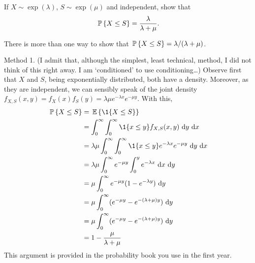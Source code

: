 \begin{question}\label{ex:3}
   If $X\sim \exp(\lambda)$, $S\sim\exp(\mu)$ and independent, show that 
    \begin{equation*}
      \P{X\leq S} = \frac{\lambda}{\lambda+\mu}.
    \end{equation*}


\begin{solution}
There is more than one way to show that $\P{X\leq S} = \lambda/(\lambda+\mu)$.  

Method 1. (I admit that, although the simplest, least technical,
method, I did not think of this right away. I am `conditioned' to use
conditioning\ldots) Observe first that $X$ and $S$, being
exponentially distributed, both have a density. Moreover, as they are
independent, we can sensibly speak of the joint density
$f_{X,S}(x,y) = f_X(x)f_S(y) = \lambda \mu e^{-\lambda x} e^{-\mu
  y}$. With this,
\begin{equation*}
  \begin{split}
    \P{X\leq S} 
&= \E{\1{X\leq S}} \\
&= \int_0^\infty \int_0^\infty \1{x\leq y} f_{X,S}(x,y)\, \d y\,\d x\\
&= \lambda \mu \int_0^\infty \int_0^\infty \1{x\leq y} e^{-\lambda x} e^{-\mu y} \, \d y\,\d x\\
&= \lambda \mu \int_0^\infty e^{-\mu y} \int_0^y e^{-\lambda x}\, \d x \, \d y \\
&= \mu \int_0^\infty e^{-\mu y} (1-e^{-\lambda y})\,\d y\\
&= \mu \int_0^\infty (e^{-\mu y} - e^{-(\lambda +\mu)y} ) \,\d y\\
&= \mu \int_0^\infty (e^{-\mu y} - e^{-(\lambda +\mu)y} ) \,\d y\\
&= 1 - \frac{\mu}{\lambda + \mu} 
  \end{split}
\end{equation*}
This argument is provided in the probability book you use in the first year.


\end{solution}
\end{question}
